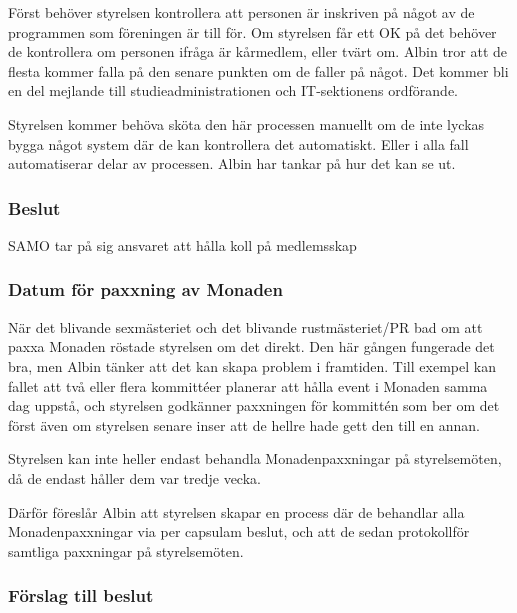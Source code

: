 \documentclass[protokoll]{dvd}
\begin{document}
Först behöver styrelsen kontrollera att personen är inskriven på något av de programmen som föreningen är till för. Om styrelsen får ett OK på det behöver de kontrollera om personen ifråga är kårmedlem, eller tvärt om. Albin tror att de flesta kommer falla på den senare punkten om de faller på något. Det kommer bli en del mejlande till studieadministrationen och IT-sektionens ordförande.

Styrelsen kommer behöva sköta den här processen manuellt om de inte lyckas bygga något system där de kan kontrollera det automatiskt. Eller i alla fall automatiserar delar av processen. Albin har tankar på hur det kan se ut.


\subsubsection*{Beslut}

\begin{attsatser}
    \item SAMO tar på sig ansvaret att hålla koll på medlemsskap
\end{attsatser}




\subsubsection{Datum för paxxning av Monaden}

När det blivande sexmästeriet och det blivande rustmästeriet/PR bad om att paxxa Monaden röstade styrelsen om det direkt. Den här gången fungerade det bra, men Albin tänker att det kan skapa problem i framtiden. Till exempel kan fallet att två eller flera kommittéer planerar att hålla event i Monaden samma dag uppstå, och styrelsen godkänner paxxningen för kommittén som ber om det först även om styrelsen senare inser att de hellre hade gett den till en annan.

Styrelsen kan inte heller endast behandla Monadenpaxxningar på styrelsemöten, då de endast håller dem var tredje vecka.

Därför föreslår Albin att styrelsen skapar en process där de behandlar alla Monadenpaxxningar via per capsulam beslut, och att de sedan protokollför samtliga paxxningar på styrelsemöten.


\subsubsection*{Förslag till beslut}
\end{document}
